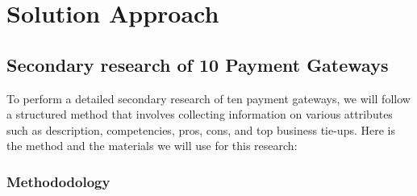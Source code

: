 \section{Solution Approach}
\subsection{Secondary research of 10 Payment Gateways}
To perform a detailed secondary research of ten payment gateways, we will follow a structured method that involves collecting information on various attributes such as description, competencies, pros, cons, and top business tie-ups. Here is the method and the materials we will use for this research:

\subsubsection{Methododology}

